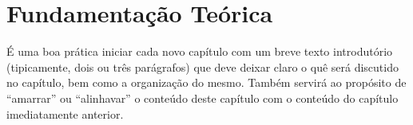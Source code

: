 
\chapter{Fundamentação Teórica}
\label{chap_fundamentacao_teorica}

É uma boa prática iniciar cada novo capítulo com um breve texto introdutório (tipicamente, dois ou três parágrafos) que deve deixar claro o quê será discutido no capítulo, bem como a organização do mesmo.
Também servirá ao propósito de ``amarrar'' ou ``alinhavar'' o conteúdo deste capítulo com o conteúdo do capítulo imediatamente anterior.
